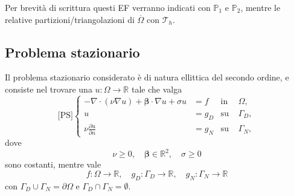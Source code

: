 \documentclass{article}
\newcommand{\derP}[2]{\frac{\partial#1}{\partial#2}}
\begin{document}
            Per brevità di scrittura questi EF verranno indicati con $\mathbb{P}_1$ e $\mathbb{P}_2$, mentre le relative partizioni/triangolazioni di $\overline\Omega$ con $\mathcal T_h$.

            
        \subsection{Problema stazionario}\label{ParProblemaStazionario}

            Il problema stazionario considerato è di natura ellittica del secondo ordine, e consiste nel trovare una $u\colon\!\Omega\rightarrow\mathbb R$ tale che valga
            \begin{equation}
                \text{[PS]}
                \left\{
                \begin{aligned}
                    -\nabla\cdot(\nu\nabla u)+\boldsymbol\beta\cdot\nabla u + \sigma u
                               &=f                &\text{in }&\Omega  ,\\
                    u          &=g_D              &\text{su }&\Gamma_D,\\
                    \nu\derP un&=g_N              &\text{su }&\Gamma_N,
                \end{aligned}
                \right.
                \label{eqProblemaStazionario}
            \end{equation}
            dove
            \begin{equation*}
                \nu\ge0,\quad
                \boldsymbol\beta\in\mathbb R^2,\quad
                \sigma\ge0
            \end{equation*}
            sono costanti, mentre vale
            \begin{equation*}
                   f\colon\Omega\to\mathbb R,\quad
                   g_D\colon\Gamma_D\to\mathbb R,\quad
                   g_N\colon\Gamma_N\to\mathbb R
            \end{equation*}
            con $\Gamma_D\cup\Gamma_N=\partial\Omega$ e $\Gamma_D\cap\Gamma_N=\emptyset$.
            
\end{document}
